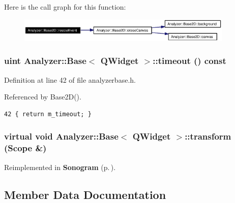 Here is the call graph for this function:\begin{figure}[H]
\begin{center}
\leavevmode
\includegraphics[width=291pt]{classAnalyzer_1_1Base2D_Sonogramb3_cgraph}
\end{center}
\end{figure}
\subsubsection{\setlength{\rightskip}{0pt plus 5cm}uint {\bf Analyzer::Base}$<$ {\bf QWidget}  $>$::timeout () const\hspace{0.3cm}{\tt  [inline, inherited]}}\label{classAnalyzer_1_1Base_Analyzer_1_1Basea0}




Definition at line 42 of file analyzerbase.h.

Referenced by Base2D().



\footnotesize\begin{verbatim}42 { return m_timeout; }
\end{verbatim}\normalsize 
{}
\subsubsection{\setlength{\rightskip}{0pt plus 5cm}virtual void {\bf Analyzer::Base}$<$ {\bf QWidget}  $>$::transform ({\bf Scope} \&)\hspace{0.3cm}{\tt  [protected, virtual, inherited]}}\label{classAnalyzer_1_1Base_Analyzer_1_1Baseb2}




Reimplemented in {\bf Sonogram} {\rm (p.\,\pageref{classSonogram_Sonograma4})}.

\subsection{Member Data Documentation}
